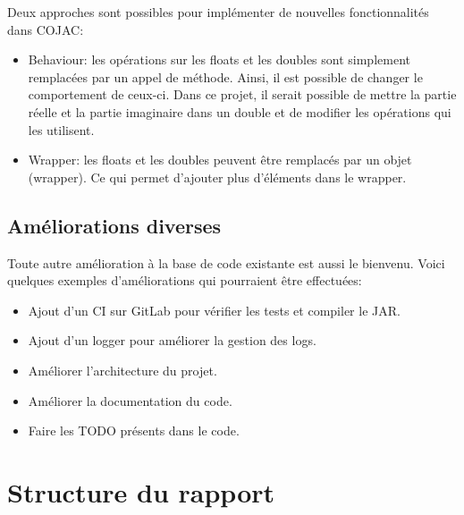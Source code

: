 Deux approches sont possibles pour implémenter de nouvelles fonctionnalités dans COJAC:
\begin{itemize}
    \item Behaviour: les opérations sur les floats et les doubles sont simplement remplacées par un appel de méthode. Ainsi, il est possible de changer le comportement de ceux-ci. Dans ce projet, il serait possible de mettre la partie réelle et la partie imaginaire dans un double et de modifier les opérations qui les utilisent.
    \item Wrapper: les floats et les doubles peuvent être remplacés par un objet (wrapper). Ce qui permet d'ajouter plus d'éléments dans le wrapper.
\end{itemize}

\subsection{Améliorations diverses}

Toute autre amélioration à la base de code existante est aussi le bienvenu. Voici quelques exemples d'améliorations qui pourraient être effectuées:
\begin{itemize}
    \item Ajout d'un CI sur GitLab pour vérifier les tests et compiler le JAR.
    \item Ajout d'un logger pour améliorer la gestion des logs.
    \item Améliorer l'architecture du projet.
    \item Améliorer la documentation du code.
    \item Faire les TODO présents dans le code.
\end{itemize}

\section{Structure du rapport}

